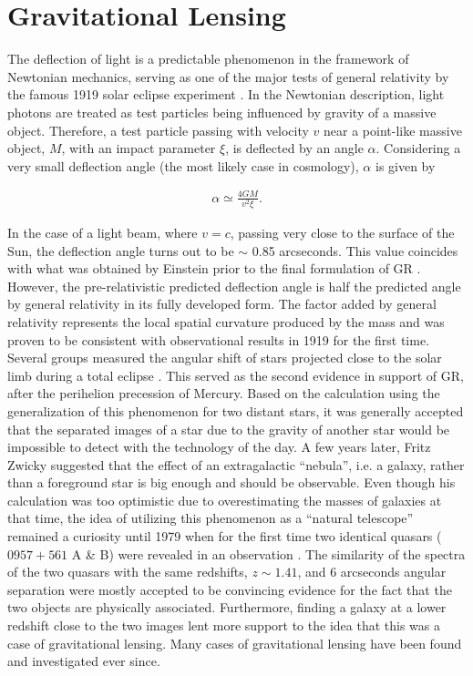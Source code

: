 \documentclass[paper=a4, fontsize=11pt]{scrartcl} %
\numberwithin{equation}{section} %
\numberwithin{figure}{section} %
\numberwithin{table}{section} %
\begin{document}
\section{Gravitational Lensing} 
\label{sec:Gravitational lensing}
The deflection of light is a predictable phenomenon in the framework of Newtonian mechanics, serving as one of the major tests of general relativity by the famous 1919 solar eclipse experiment \citep[][]{Eddington+1919}. In the Newtonian description, light photons are treated as test particles being influenced by gravity of a massive object. Therefore, a test particle passing with velocity $v$ near a point-like massive object, $M$, with an impact parameter $\xi$, is deflected by an angle $\alpha$. Considering a very small deflection angle (the most likely case in cosmology), $\alpha$ is given by

\begin{eqnarray}
\label{eq:alpha}
\alpha \simeq \frac{4GM}{v^2 \xi}.
\end{eqnarray}

In the case of a light beam, where $v = c$, passing very close to the surface of the Sun, the deflection angle turns out to be $\sim$ 0.85 arcseconds. This value coincides with what was obtained by Einstein prior to the final formulation of GR \citep[][]{Einstein1911}. However, the pre-relativistic predicted deflection angle is half the predicted angle by general relativity in its fully developed form. The factor added by general relativity represents the local spatial curvature produced by the mass and was proven to be consistent with observational results in 1919 for the first time. Several groups measured the angular shift of stars projected close to the solar limb during a total eclipse \citet{Eddington+1919}. This served as the second evidence in support of GR, after the perihelion precession of Mercury. Based on the calculation using the generalization of this phenomenon for two distant stars, it was generally accepted that the separated images of a star due to the gravity of another star would be impossible to detect with the technology of the day. A few years later, Fritz Zwicky suggested  \citep{Zwicky1937} that the effect of an extragalactic ``nebula'', i.e. a galaxy, rather than a foreground star is big enough and should be observable. Even though his calculation was too optimistic due to overestimating the masses of galaxies at that time, the idea of utilizing this phenomenon as a ``natural telescope''  remained a curiosity until 1979 when for the first time two identical quasars ($0957+561$ A \& B) were revealed in an observation \citep{Walsh+1979}. The similarity of the spectra of the two quasars with the same redshifts, $z \sim 1.41$, and 6 arcseconds angular separation were mostly accepted to be convincing evidence for the fact that the two objects are physically associated. Furthermore, finding a galaxy at a lower redshift close to the two images lent more support to the idea that this was a case of gravitational lensing. Many cases of gravitational lensing have been found and investigated ever since.
\end{document}
